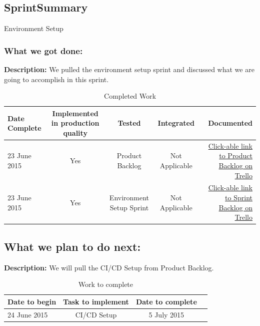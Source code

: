\documentclass[a4paper]{article}
\begin{document}
\subsection{SprintSummary}
Environment Setup 
\subsubsection{What we got done: }
\textbf{Description: }We pulled the environment setup sprint and discussed what we are going to accomplish in this sprint. \\

\begin{table}[h]
\centering
\caption{Completed Work}
\begin{tabular}{| l | c | c | c | r |}
\hline 
Date Complete & Implemented in production quality & Tested & Integrated & Documented\\ \hline
23 June 2015 & Yes & Product Backlog & Not Applicable & \href{https://trello.com/b/FtBs3HX1}{Click-able link to Product Backlog on Trello}\\ \hline
23 June 2015 & Yes & Environment Setup Sprint & Not Applicable & \href{https://trello.com/b/hBJF6EUd}{Click-able link to Sprint Backlog on Trello}\\ 
\hline
\end{tabular}
\end{table}

\subsection{What we plan to do next:}
\textbf{Description: }We will pull the CI/CD Setup from Product Backlog. \\

\begin{table}[h]
\centering
\caption{Work to complete}
\begin{tabular}{| l | c | c | r |}
\hline
Date to begin  & Task to implement & Date to complete\\ \hline
24 June 2015 & CI/CD Setup & 5 July 2015 \\
\hline
\end{tabular}
\end{table}
\end{document}
